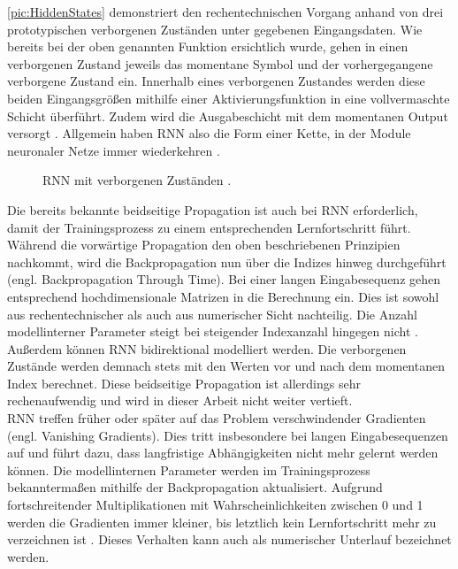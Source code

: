 \noindent
\autoref{pic:HiddenStates} demonstriert den rechentechnischen Vorgang anhand von drei prototypischen verborgenen Zuständen unter gegebenen Eingangsdaten. Wie bereits bei der oben genannten Funktion ersichtlich wurde, gehen in einen verborgenen Zustand jeweils das momentane Symbol und der vorhergegangene verborgene Zustand ein. Innerhalb eines verborgenen Zustandes werden diese beiden Eingangsgrößen mithilfe einer Aktivierungsfunktion in eine vollvermaschte Schicht überführt. Zudem wird die Ausgabeschicht mit dem momentanen Output versorgt \cite[S.~325]{ZHA20}. Allgemein haben \ac{RNN} also die Form einer Kette, in der Module neuronaler Netze immer wiederkehren \cite{AIU19}.

\begin{figure}[h!]
  \centering
  \caption{RNN mit verborgenen Zuständen \cite[S.~325]{ZHA20}.}
  \label{pic:HiddenStates}
\end{figure}

\noindent
Die bereits bekannte beidseitige Propagation ist auch bei \ac{RNN} erforderlich, damit der Trainingsprozess zu einem entsprechenden Lernfortschritt führt. Während die vorwärtige Propagation den oben beschriebenen Prinzipien nachkommt, wird die Backpropagation nun über die Indizes hinweg durchgeführt (engl. Backpropagation Through Time). Bei einer langen Eingabesequenz gehen entsprechend hochdimensionale Matrizen in die Berechnung ein. Dies ist sowohl aus rechentechnischer als auch aus numerischer Sicht nachteilig. Die Anzahl modellinterner Parameter steigt bei steigender Indexanzahl hingegen nicht \cite[S.~328,~340]{ZHA20}.\\

\noindent
Außerdem können \ac{RNN} bidirektional modelliert werden. Die verborgenen Zustände werden demnach stets mit den Werten vor und nach dem momentanen Index berechnet. Diese beidseitige Propagation ist allerdings sehr rechenaufwendig und wird in dieser Arbeit nicht weiter vertieft.\\

\noindent
\ac{RNN} treffen früher oder später auf das Problem verschwindender Gradienten (engl. Vanishing Gradients). Dies tritt insbesondere bei langen Eingabesequenzen auf und führt dazu, dass langfristige Abhängigkeiten nicht mehr gelernt werden können. Die modellinternen Parameter werden im Trainingsprozess bekanntermaßen mithilfe der Backpropagation aktualisiert. Aufgrund fortschreitender Multiplikationen mit Wahrscheinlichkeiten zwischen 0 und 1 werden die Gradienten immer kleiner, bis letztlich kein Lernfortschritt mehr zu verzeichnen ist \cite{ARB18}. Dieses Verhalten kann auch als numerischer Unterlauf bezeichnet werden.\\

